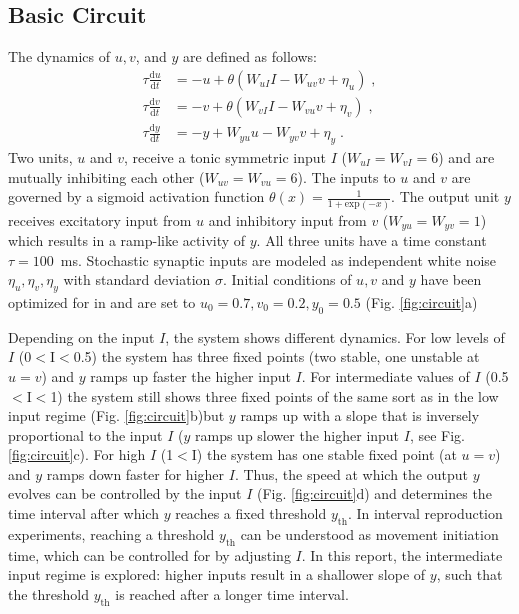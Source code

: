 \documentclass[10pt]{article}
\begin{document}
\subsection{Basic Circuit}
The dynamics of $u, v$, and $y$ are defined as follows:
\begin{equation} \label{circuit}
	\begin{split}
	\tau\frac{\text{d}u}{\text{d}t} & = -u + \theta(W_{uI}I - W_{uv}v + \eta_u) \;, \\
	\tau\frac{\text{d}v}{\text{d}t} & = -v + \theta(W_{vI}I - W_{vu}v + \eta_v) \;, \\
	\tau\frac{\text{d}y}{\text{d}t} & = -y + W_{yu}u - W_{yv}v + \eta_y \;.
	\end{split}
\end{equation}
Two units, $u$ and $v$, receive a tonic symmetric input $I$ ($W_{uI}=W_{vI}=6$) and are mutually inhibiting each other ($W_{uv}=W_{vu}=6$). 
The inputs to $u$ and $v$ are governed by a sigmoid activation function $\theta(x) = \frac{1}{1+\text{exp}(-x)}$.
The output unit $y$ receives excitatory input from $u$ and inhibitory input from $v$ ($W_{yu}=W_{yv}=1$) which results in a ramp-like activity of $y$.
All three units have a time constant $\tau = 100$~ms. 
Stochastic synaptic inputs are modeled as independent white noise $\eta_u, \eta_v, \eta_y$ with standard deviation $\sigma$.
Initial conditions of $u, v$ and $y$ have been optimized for in \cite{Egger2020} and are set to $u_0=0.7, v_0=0.2, y_0=0.5$ (Fig. \ref{fig:circuit}a)

Depending on the input $I$, the system shows different dynamics. For low levels of $I$ (0$<$I$<$0.5) the system has three fixed points (two stable, one unstable at $u=v$) and $y$ ramps up faster the higher input $I$. 
For intermediate values of $I$ (0.5$<$I$<$1) the system still shows three fixed points of the same sort as in the low input regime (Fig. \ref{fig:circuit}b)but $y$ ramps up with a slope that is inversely proportional to the input $I$ ($y$ ramps up slower the higher input $I$, see Fig. \ref{fig:circuit}c). 
For high $I$ (1$<$I) the system has one stable fixed point (at $u=v$) and $y$ ramps down faster for higher $I$.
Thus, the speed at which the output $y$ evolves can be controlled by the input $I$ (Fig. \ref{fig:circuit}d) and determines the time interval after which $y$ reaches a fixed threshold $y_{\text{th}}$. 
In interval reproduction experiments, reaching a threshold $y_{\text{th}}$ can be understood as movement initiation time, which can be controlled for by adjusting $I$.
In this report, the intermediate input regime is explored: higher inputs result in a shallower slope of $y$, such that the threshold $y_{\text{th}}$ is reached after a longer time interval.
\end{document}
